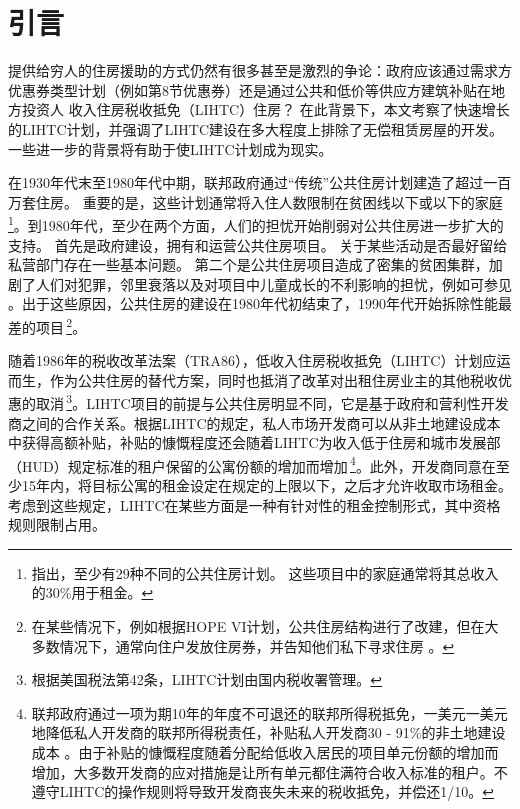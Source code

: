 \documentclass[lang=cn,11pt,a4paper]{paper}
\begin{document}
\section{引言}

提供给穷人的住房援助的方式仍然有很多甚至是激烈的争论：政府应该通过需求方优惠券类型计划（例如第8节优惠券）还是通过公共和低价等供应方建筑补贴在地方投资人 收入住房税收抵免（LIHTC）住房？ 在此背景下，本文考察了快速增长的LIHTC计划，并强调了LIHTC建设在多大程度上排除了无偿租赁房屋的开发。 一些进一步的背景将有助于使LIHTC计划成为现实。

在1930年代末至1980年代中期，联邦政府通过“传统”公共住房计划建造了超过一百万套住房。 重要的是，这些计划通常将入住人数限制在贫困线以下或以下的家庭 \citep{Olsen2003365}\,\footnote{\cite{Olsen2003365}指出，至少有29种不同的公共住房计划。 这些项目中的家庭通常将其总收入的30\%用于租金。}。到1980年代，至少在两个方面，人们的担忧开始削弱对公共住房进一步扩大的支持。 首先是政府建设，拥有和运营公共住房项目。 关于某些活动是否最好留给私营部门存在一些基本问题。 第二个是公共住房项目造成了密集的贫困集群，加剧了人们对犯罪，邻里衰落以及对项目中儿童成长的不利影响的担忧，例如可参见 \cite{Currie200099,Jencks1990111}。出于这些原因，公共住房的建设在1980年代初结束了，1990年代开始拆除性能最差的项目\,\footnote{在某些情况下，例如根据HOPE VI计划，公共住房结构进行了改建，但在大多数情况下，通常向住户发放住房券，并告知他们私下寻求住房 \cite{Jacob2004233}。}。

随着1986年的税收改革法案（TRA86），低收入住房税收抵免（LIHTC）计划应运而生，作为公共住房的替代方案，同时也抵消了改革对出租住房业主的其他税收优惠的取消\citep{USCongress1987}\,\footnote{根据美国税法第42条，LIHTC计划由国内税收署管理。}。LIHTC项目的前提与公共住房明显不同，它是基于政府和营利性开发商之间的合作关系。根据LIHTC的规定，私人市场开发商可以从非土地建设成本中获得高额补贴，补贴的慷慨程度还会随着LIHTC为收入低于住房和城市发展部（HUD）规定标准的租户保留的公寓份额的增加而增加\,\footnote{联邦政府通过一项为期10年的年度不可退还的联邦所得税抵免，一美元一美元地降低私人开发商的联邦所得税责任，补贴私人开发商30 - 91\%的非土地建设成本 \cite{Eriksen2009141}。由于补贴的慷慨程度随着分配给低收入居民的项目单元份额的增加而增加，大多数开发商的应对措施是让所有单元都住满符合收入标准的租户。不遵守LIHTC的操作规则将导致开发商丧失未来的税收抵免，并偿还1/10。}。此外，开发商同意在至少15年内，将目标公寓的租金设定在规定的上限以下，之后才允许收取市场租金。考虑到这些规定，LIHTC在某些方面是一种有针对性的租金控制形式，其中资格规则限制占用。
\end{document}
